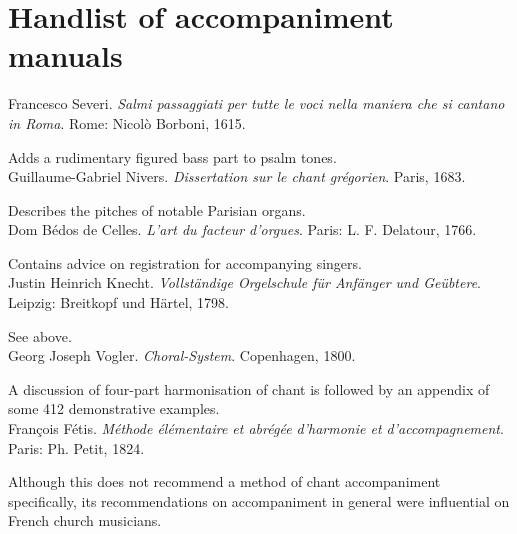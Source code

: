 \chapter{Handlist of accompaniment manuals}
\label{ap:handlist}
 \singlespacing

    \parindent=0pt
    \hangindent=0pt
  Francesco Severi. \emph{Salmi passaggiati per tutte le voci nella maniera che si cantano in Roma}. Rome:  Nicolò Borboni, 1615.

     \parindent=20pt
     \hangindent=20pt
     Adds a rudimentary figured bass part to psalm tones.\\

    \parindent=0pt
    \hangindent=0pt
  Guillaume-Gabriel Nivers. \emph{Dissertation sur le chant grégorien}. Paris, 1683.

     \parindent=20pt
     \hangindent=20pt
     Describes the pitches of notable Parisian organs.\\

    \parindent=0pt
    \hangindent=0pt
  Dom Bédos de Celles. \emph{L'art du facteur d'orgues}. Paris:  L. F. Delatour, 1766.

     \parindent=20pt
     \hangindent=20pt
     Contains advice on registration for accompanying singers.\\

    \parindent=0pt
    \hangindent=0pt
  Justin Heinrich Knecht. \emph{Vollständige Orgelschule für Anfänger und Geübtere}. Leipzig:  Breitkopf und Härtel, 1798.

     \parindent=20pt
     \hangindent=20pt
     See  above.\\

    \parindent=0pt
    \hangindent=0pt
  Georg Joseph Vogler. \emph{Choral-System}. Copenhagen, 1800.

     \parindent=20pt
     \hangindent=20pt
     A discussion of four-part harmonisation of chant is followed by an appendix of some 412 demonstrative examples.\\

    \parindent=0pt
    \hangindent=0pt
  François Fétis. \emph{Méthode élémentaire et abrégée d'harmonie et d'accompagnement}. Paris:  Ph. Petit, 1824.

     \parindent=20pt
     \hangindent=20pt
     Although this does not recommend a method of chant accompaniment specifically, its recommendations on accompaniment in general were influential on French church musicians.\\

